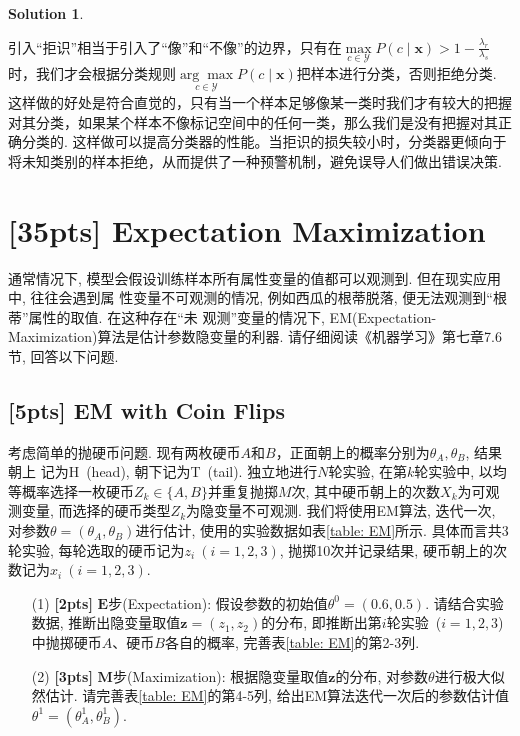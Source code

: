 \documentclass[a4paper,UTF8]{article}
\numberwithin{equation}{section}
\theoremstyle{definition}
\newtheorem*{solution}{Solution}
\def \z {\boldsymbol{z}}
\begin{document}
\begin{solution}
\begin{enumerate}
\begin{equation}
    \end{equation}
    引入“拒识”相当于引入了“像”和“不像”的边界，只有在$\max \limits_{c \in \mathcal{Y}} P(c \mid \boldsymbol{x}) > 1-\frac{\lambda_{r}}{\lambda_{s}}$时，我们才会根据分类规则$\underset{c \in \mathcal{Y}}{\arg \max } P(c \mid \boldsymbol{x})$把样本进行分类，否则拒绝分类. 这样做的好处是符合直觉的，只有当一个样本足够像某一类时我们才有较大的把握对其分类，如果某个样本不像标记空间中的任何一类，那么我们是没有把握对其正确分类的. 这样做可以提高分类器的性能。当拒识的损失较小时，分类器更倾向于将未知类别的样本拒绝，从而提供了一种预警机制，避免误导人们做出错误决策.
\end{enumerate}
\end{solution}

\newpage

\section{[35pts] Expectation Maximization}
通常情况下, 模型会假设训练样本所有属性变量的值都可以观测到. 但在现实应用中, 往往会遇到属
性变量不可观测的情况, 例如西瓜的根蒂脱落, 便无法观测到“根蒂”属性的取值. 在这种存在“未
观测”变量的情况下, EM(Expectation-Maximization)算法是估计参数隐变量的利器. 
请仔细阅读《机器学习》第七章7.6节, 回答以下问题.

\subsection{[5pts] EM with Coin Flips}
考虑简单的抛硬币问题. 现有两枚硬币$A$和$B$，正面朝上的概率分别为$\theta_A, \theta_B$, 结果朝上
记为H~(head), 朝下记为T~(tail). 独立地进行$N$轮实验, 在第$k$轮实验中, 以均等概率选择一枚硬币$Z_k \in \{A,B\}$并重复抛掷$M$次, 
其中硬币朝上的次数$X_k$为可观测变量, 而选择的硬币类型$Z_k$为隐变量不可观测. 
我们将使用EM算法, 迭代一次, 对参数$\theta = (\theta_A, \theta_B)$进行估计, 使用的实验数据如表\ref{table: EM}所示. 
具体而言共3轮实验, 每轮选取的硬币记为$z_i ~ (i=1,2,3)$, 抛掷10次并记录结果, 硬币朝上的次数记为$x_i ~ (i=1,2,3)$. 

\begin{itemize}
    \item[(1)] \textbf{[2pts]} $\mathbf{E}$步(Expectation): 假设参数的初始值$\theta^0 = (0.6, 0.5)$.
    请结合实验数据, 推断出隐变量取值$\z = (z_1, z_2)$的分布, 即推断出第$i$轮实验~($i=1,2,3$)中抛掷硬币$A$、硬币$B$各自的概率, 
    完善表\ref{table: EM}的第2-3列.
    \item[(2)] \textbf{[3pts]} $\mathbf{M}$步(Maximization): 根据隐变量取值$\z$的分布, 对参数$\theta$进行极大似然估计.
    请完善表\ref{table: EM}的第4-5列, 给出EM算法迭代一次后的参数估计值$\theta^1 = (\theta_A^1, \theta_B^1)$.  
\end{itemize}
\end{document}

